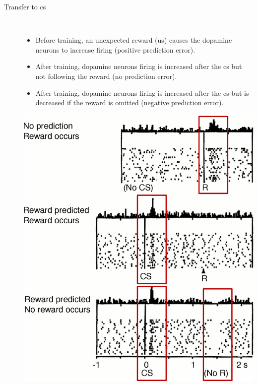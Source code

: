 \begin{description}
    \item[Transfer to \ac{cs}] 
        \phantom{} \\
        \begin{minipage}{0.65\linewidth}
            \begin{itemize}[leftmargin=*]
                \item Before training, an unexpected reward (\ac{us}) causes the dopamine neurons to increase firing (positive prediction error).
                \item After training, dopamine neurons firing is increased after the \ac{cs} but not following the reward (no prediction error).
                \item After training, dopamine neurons firing is increased after the \ac{cs} but is decreased if the reward is omitted (negative prediction error).
            \end{itemize}
        \end{minipage}
        \begin{minipage}{0.35\linewidth}
            \centering
            \includegraphics[width=\linewidth]{./img/dopamine_transfer_cs.png}
        \end{minipage}


\end{description}
